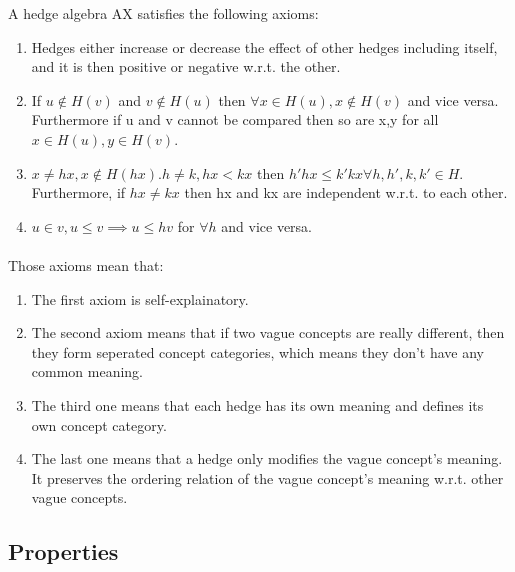 \documentclass[part1.tex]{subfiles}
\begin{document}
A hedge algebra AX satisfies the following  axioms:
\begin{enumerate}

        \item Hedges either increase or decrease the effect of other hedges including itself, and it is 
then positive or negative w.r.t. the other.

        \item If \(u\notin H(v)\) and \(v\notin H(u)\) then \(\forall x\in H(u), x\notin H(v)\) and vice versa. 
	Furthermore if u and v cannot be compared then so are x,y for all \(x\in H(u), y\in H(v)\).


        \item \(x \not = hx, x \notin H(hx). h\neq k, hx<kx\) then \(h'hx\le k'kx\forall h,h',k,k'\in
	H.\) Furthermore, if \(hx \neq kx\) then hx and kx are independent w.r.t. to each other.


        \item \(u \in v, u \le v\implies u\le hv\) for \(\forall h\) and vice versa.
\end{enumerate}
\paragraph{} Those axioms mean that:
\begin{enumerate}
        \item The first axiom is self-explainatory.
        \item The second axiom means that if two vague concepts are really different, then they form seperated concept categories, which means they don't have any common meaning.
        \item The third one means that each hedge has its own meaning and defines its own concept category.
        \item The last one means that a hedge only modifies the vague concept's meaning. It preserves the ordering relation of the vague concept's meaning w.r.t. other vague concepts.
\end{enumerate}
\subsection{Properties}
\end{document}
